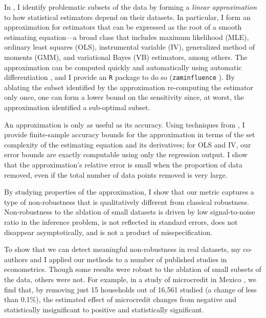 In \citet{giordano:2020:amip}, I identify problematic subsets of the data by
forming a {\em linear approximation} to how statistical estimators depend on
their datasets. In particular, I form an approximation for estimators that can be
expressed as the root of a smooth estimating equation---a broad class that
includes maximum likelihood (MLE), ordinary least squares (OLS), instrumental
variable (IV), generalized method of moments (GMM), and variational Bayes (VB)
estimators, among others.  The approximation can be computed quickly and
automatically using automatic differentiation \citep{baydin:2015:automatic,
autograd}, and I provide an \texttt{R} package to do so (\texttt{zaminfluence}
\citep{zaminfluence}).
By ablating the subset identified by the approximation re-computing the
estimator only once, one can form a lower bound on the sensitivity since, at
worst, the approximation identified a sub-optimal subset.

An approximation is only as useful as its accuracy.  Using techniques from
\citet{giordano:2019:hoij}, I provide finite-sample accuracy bounds for the
approximation  in terms of the set complexity of the estimating equation and its
derivatives; for OLS and IV, our error bounds are exactly computable using only
the regression output.  I show that the approximation's relative error is small
when the proportion of data removed, even if the total number of data points
removed is very large.

By studying properties of the approximation, I show that our metric captures a
type of non-robustness that is qualitatively different from classical
robustness.  Non-robustness to the ablation of small datasets is driven by low
signal-to-noise ratio in the inference problem, is not reflected in standard
errors, does not disappear asymptotically, and is not a product of
misspecification.

To show that we can detect meaningful non-robustness in real datasets, my
co-authors and I applied our methods to a number of published studies in
econometrics.  Though some results were robust to the ablation of small subsets
of the data, others were not. For example, in a study of microcredit in Mexico
\citep{angelucci:2015:microcredit}, we find that, by removing just 15 households
out of 16,561 studied (a change of less than 0.1\%), the estimated effect of
microcredit changes from negative and statistically insignificant to positive
and statistically significant.

